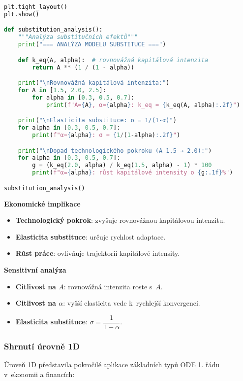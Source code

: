 \begin{example}
\begin{lstlisting}[language=Python, caption={Implementace modelu substituce v~Pythonu}]
plt.tight_layout()
plt.show()

def substitution_analysis():
    """Analýza substitučních efektů"""
    print("=== ANALÝZA MODELU SUBSTITUCE ===")

    def k_eq(A, alpha):  # rovnovážná kapitálová intenzita
        return A ** (1 / (1 - alpha))

    print("\nRovnovážná kapitálová intenzita:")
    for A in [1.5, 2.0, 2.5]:
        for alpha in [0.3, 0.5, 0.7]:
            print(f"A={A}, α={alpha}: k_eq = {k_eq(A, alpha):.2f}")

    print("\nElasticita substituce: σ = 1/(1-α)")
    for alpha in [0.3, 0.5, 0.7]:
        print(f"α={alpha}: σ = {1/(1-alpha):.2f}")

    print("\nDopad technologického pokroku (A 1.5 → 2.0):")
    for alpha in [0.3, 0.5, 0.7]:
        g = (k_eq(2.0, alpha) / k_eq(1.5, alpha) - 1) * 100
        print(f"α={alpha}: růst kapitálové intensity o {g:.1f}%")

substitution_analysis()
\end{lstlisting}

\noindent\textbf{Ekonomické implikace}
\begin{itemize}
\item \textbf{Technologický pokrok}: zvyšuje rovnovážnou kapitálovou intenzitu.
\item \textbf{Elasticita substituce}: určuje rychlost adaptace.
\item \textbf{Růst práce}: ovlivňuje trajektorii kapitálové intensity.
\end{itemize}

\noindent\textbf{Sensitivní analýza}
\begin{itemize}
\item \textbf{Citlivost na $A$}: rovnovážná intenzita roste s~$A$.
\item \textbf{Citlivost na $\alpha$}: vyšší elasticita vede k~rychlejší konvergenci.
\item \textbf{Elasticita substituce}: $\sigma = \dfrac{1}{1-\alpha}$.
\end{itemize}
\end{example}

\subsubsection{Shrnutí úrovně 1D}
\label{sec:shrnuti-uroven-1d}

Úroveň 1D představila pokročilé aplikace základních typů ODE 1. řádu v~ekonomii a financích:

